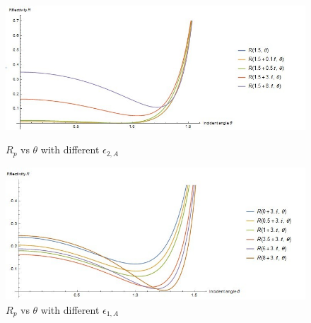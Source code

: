 \documentclass{article}
\begin{document}
		\begin{figure}
		\centering
			\begin{minipage}[b]{0.45\linewidth}
			\includegraphics[width=\linewidth]{fig1.jpg}
			\caption{$R_{p}$ vs $\theta$ with different $\epsilon_{2,A}$}
			\label{fig:minipage1}
			\end{minipage}
			\quad
			\begin{minipage}[b]{0.45\linewidth}
			\includegraphics[width=\linewidth]{fig2.jpg}
			\caption{$R_{p}$ vs $\theta$ with different $\epsilon_{1,A}$}
			\label{fig:minipage2}
			\end{minipage}
		\end{figure}
\end{document}
